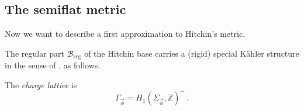 \documentclass[12pt,letterpaper,reqno]{article}
\numberwithin{equation}{section}
\newcommand{\cB}{\ensuremath{\mathcal B}}
\newcommand{\cM}{\ensuremath{\mathcal M}}
\newcommand{\bbZ}{\ensuremath{\mathbb Z}}
\newcommand{\kahler}{K\"ahler\xspace}
\newcommand{\hk}{hyperk\"ahler\xspace}
\newcommand{\reg}{\mathrm{reg}}
\newcommand{\vphi}{{\vec\phi}}
\newcommand{\ti}[1]{\textit{#1}}
\DeclareMathOperator{\Tr}{Tr}
\newcommand{\fixme}[1]{{\color{orange}{[#1]}}}
\begin{document}









\subsection{The semiflat metric}

Now we want to describe a first approximation to Hitchin's metric.

The regular part $\cB_\reg$ of the Hitchin base 
carries a (rigid) special \kahler structure 
in the sense of \cite{Freed:1997dp}, as follows.

\begin{defn}
The \ti{charge lattice} is
\begin{equation}
    \Gamma_\vphi = H_1(\Sigma_\vphi, \bbZ)^- \, .
\end{equation}
\end{defn}
\end{document}
